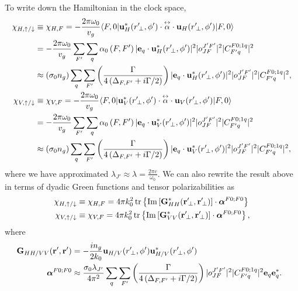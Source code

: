 To write down the Hamiltonian in the clock space,
\begin{align}
\chi_{H,\uparrow/\downarrow} & \equiv \chi_{H,F} =- \frac{2\pi \omega_0}{v_g} \bra{F,0} 
	\mathbf{u}^*_H(r^\prime\!_\perp, \phi') \cdot \tensor{\alpha} \cdot 
	\mathbf{u}_{H}(r^\prime\!_\perp, 
	\phi') \ket{F,0} \\
	& =- \frac{2\pi \omega_0}{v_g} \sum_{F'} \sum_q \alpha_0\left( F,F'  \right) |\mathbf{e}_q \cdot 
	\mathbf{u}_H^*(r^\prime\!_\perp,\phi')|^2 |o^{J'F'}_{JF} |^2 
	|C^{F 0;1q}_{F' q}|^2\\
	& \approx  \left( \sigma_0 n_g  \right)  \sum_q \sum_{F'} \left( 
		\frac{\Gamma}{4 
		\left(\Delta_{F,F'}+i\Gamma/2\right) }  \right) |\mathbf{e}_q \cdot 
		\mathbf{u}_H^*(r^\prime\!_\perp,\phi')|^2 |o^{J'F'}_{JF} |^2 
		|C^{F 0;1q}_{F' q}|^2,\label{eq:chiHeu}\\
\chi_{V,\uparrow/\downarrow} & \equiv \chi_{V,F} =- \frac{2\pi \omega_0}{v_g} \bra{F,0} 
	\mathbf{u}^*_V(r^\prime\!_\perp, \phi') \cdot \tensor{\alpha} \cdot 
	\mathbf{u}_{V}(r^\prime\!_\perp, 
	\phi') \ket{F,0} \\
	& =- \frac{2\pi \omega_0}{v_g} \sum_{F'} \sum_q \alpha_0\left( F,F'  \right) |\mathbf{e}_q \cdot 
	\mathbf{u}_V^*(r^\prime\!_\perp,\phi')|^2 |o^{J'F'}_{JF} |^2 
	|C^{F 0;1q}_{F' q}|^2\\
	& \approx   \left( \sigma_0 n_g  \right)  \sum_q\sum_{F'} \left( 
		\frac{\Gamma}{4 
		\left(\Delta_{F,F'}+i\Gamma/2\right) }  \right) |\mathbf{e}_q \cdot 
		\mathbf{u}_V^*(r^\prime\!_\perp,\phi')|^2 |o^{J'F'}_{JF} |^2 
		|C^{F 0;1q}_{F' q}|^2,\label{eq:chiVeu}
\end{align}
where we have approximated $ \lambda_{J'}\approx \lambda = \frac{2\pi c}{\omega_0} $.  We can also 
rewrite the result above in terms of dyadic Green functions and tensor polarizabilities as
\begin{align}
\chi_{H,\uparrow/\downarrow} & \equiv \chi_{H,F} = 4\pi k_0^2 \tr \left\{ \mathrm{Im}\left[ 
\mathbf{G}^*_{HH}(\br^\prime\!_\perp,\br^\prime\!_\perp) \right] \cdot \boldsymbol{\alpha}^{F0;F0} 
\right\}\label{eq:chiHGalpha}\\
\chi_{V,\uparrow/\downarrow} & \equiv \chi_{V,F} = 4\pi k_0^2 \tr \left\{ \mathrm{Im}\left[ 
\mathbf{G}^*_{VV}(\br^\prime\!_\perp,\br^\prime\!_\perp) \right] \cdot \boldsymbol{\alpha}^{F0;F0} 
\right\},\label{eq:chiGalpha}
\end{align}
where 
\begin{align} 
\!\!\!\! \mathbf{G}_{HH/VV}(\mathbf{r}',\mathbf{r}') &= -\frac{in_g}{2k_0} 
\mathbf{u}_{H/V}(r^\prime\!_\perp,\phi')\mathbf{u}_{H/V}^*(r^\prime\!_\perp,\phi')\\
\boldsymbol{\alpha}^{F0;F0} &\approx \frac{\sigma_0\lambda_{J'}}{4\pi^2}  \sum_q \sum_{F'} \left( 
		\frac{\Gamma}{4 
		\left(\Delta_{F,F'}+i\Gamma/2\right) }  \right)   |o^{J'F'}_{JF} |^2 
		|C^{F 0;1q}_{F' q}|^2  \mathbf{e}_q \mathbf{e}_q^*.
\end{align}
 
